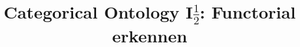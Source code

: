 \documentclass[a4paper]{../birkjour}
\title{Categorical Ontology I$\frac{1}{2}$: Functorial erkennen}
\begin{document}
\scriptsize

\maketitle

\tableofcontents









\end{document}
